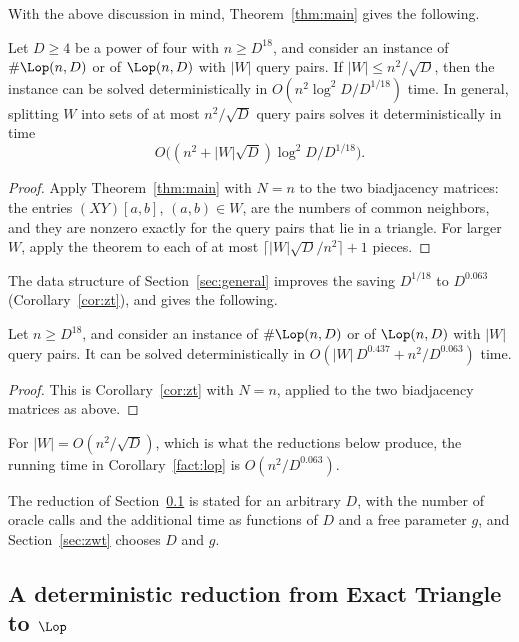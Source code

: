 With the above discussion in mind, Theorem~\ref{thm:main} gives the following.

\begin{corollary}\label{fact:lopmain}
Let $D\ge4$ be a power of four with $n\ge D^{18}$, and consider an instance of $\#\Lop(n,D)$ or of $\Lop(n,D)$ with $|W|$ query pairs. If $|W|\le n^2/\sqrt D$, then the instance can be solved deterministically in $O(n^2\log^2\!D/D^{1/18})$ time. In general, splitting $W$ into sets of at most $n^2/\sqrt D$ query pairs solves it deterministically in time
\[
O\big((n^2+|W|\sqrt D)\log^2\!D/D^{1/18}\big).
\]
\end{corollary}
\begin{proof}
Apply Theorem~\ref{thm:main} with $N=n$ to the two biadjacency matrices: the entries $(XY)[a,b]$, $(a,b)\in W$, are the numbers of common neighbors, and they are nonzero exactly for the query pairs that lie in a triangle. For larger $W$, apply the theorem to each of at most $\lceil|W|\sqrt D/n^2\rceil+1$ pieces.
\end{proof}

The data structure of Section~\ref{sec:general} improves the saving $D^{1/18}$ to $D^{0.063}$ (Corollary~\ref{cor:zt}), and gives the following.

\begin{corollary}\label{fact:lop}
Let $n\ge D^{18}$, and consider an instance of $\#\Lop(n,D)$ or of $\Lop(n,D)$ with $|W|$ query pairs. It can be solved deterministically in $O(|W|\,D^{0.437}+n^2/D^{0.063})$ time. 
\end{corollary}
\begin{proof}
This is Corollary~\ref{cor:zt} with $N=n$, applied to the two biadjacency matrices as above.
\end{proof}

For $|W|=O(n^2/\sqrt D)$, which is what the reductions below produce, the running time in Corollary~\ref{fact:lop} is $O(n^2/D^{0.063})$.

The reduction of Section~\ref{sec:redproof} is stated for an arbitrary $D$, with the number of oracle calls and the additional time as functions of $D$ and a free parameter $g$, and Section~\ref{sec:zwt} chooses $D$ and $g$.

\subsection{A deterministic reduction from Exact Triangle to \texorpdfstring{{\boldmath$\Lop$}}{Lop}}\label{sec:redproof}

